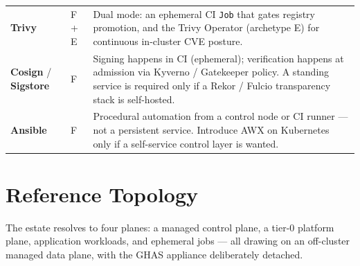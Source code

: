 \documentclass[10pt,letterpaper]{article}
\newcommand{\tool}[1]{\textbf{#1}}
\begin{document}
\begin{longtable}{L{1.15in} C{0.5in} L{4.9in}}
\tool{Trivy} & F + E & Dual mode: an ephemeral CI \texttt{Job} that gates registry promotion, and the Trivy Operator (archetype E) for continuous in-cluster CVE posture. \\
\tool{Cosign} / \tool{Sigstore} & F & Signing happens in CI (ephemeral); verification happens at admission via Kyverno / Gatekeeper policy. A standing service is required only if a Rekor / Fulcio transparency stack is self-hosted. \\
\tool{Ansible} & F & Procedural automation from a control node or CI runner --- not a persistent service. Introduce AWX on Kubernetes only if a self-service control layer is wanted. \\
\end{longtable}
\normalsize

\section{Reference Topology}

The estate resolves to four planes: a managed control plane, a tier-0 platform plane, application workloads, and ephemeral jobs --- all drawing on an off-cluster managed data plane, with the GHAS appliance deliberately detached.
\end{document}
